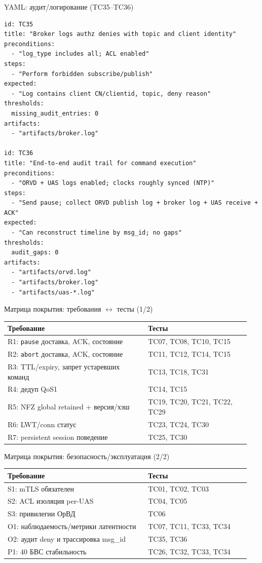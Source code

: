 \documentclass[aspectratio=169]{beamer}
\begin{document}
\begin{frame}{YAML: аудит/логирование (TC35--TC36)}
\small
\begin{verbatim}
id: TC35
title: "Broker logs authz denies with topic and client identity"
preconditions:
  - "log_type includes all; ACL enabled"
steps:
  - "Perform forbidden subscribe/publish"
expected:
  - "Log contains client CN/clientid, topic, deny reason"
thresholds:
  missing_audit_entries: 0
artifacts:
  - "artifacts/broker.log"

id: TC36
title: "End-to-end audit trail for command execution"
preconditions:
  - "ORVD + UAS logs enabled; clocks roughly synced (NTP)"
steps:
  - "Send pause; collect ORVD publish log + broker log + UAS receive + ACK"
expected:
  - "Can reconstruct timeline by msg_id; no gaps"
thresholds:
  audit_gaps: 0
artifacts:
  - "artifacts/orvd.log"
  - "artifacts/broker.log"
  - "artifacts/uas-*.log"
\end{verbatim}
\end{frame}

\begin{frame}{Матрица покрытия: требования $\leftrightarrow$ тесты (1/2)}
\small
\begin{tabular}{@{}p{0.55\linewidth}p{0.40\linewidth}@{}}
\toprule
Требование & Тесты \\
\midrule
R1: \texttt{pause} доставка, ACK, состояние & TC07, TC08, TC10, TC15 \\
R2: \texttt{abort} доставка, ACK, состояние & TC11, TC12, TC14, TC15 \\
R3: TTL/expiry, запрет устаревших команд & TC13, TC18, TC31 \\
R4: дедуп QoS1 & TC14, TC15 \\
R5: NFZ global retained + версия/хэш & TC19, TC20, TC21, TC22, TC29 \\
R6: LWT/conn статус & TC23, TC24, TC30 \\
R7: persistent session поведение & TC25, TC30 \\
\bottomrule
\end{tabular}
\end{frame}

\begin{frame}{Матрица покрытия: безопасность/эксплуатация (2/2)}
\small
\begin{tabular}{@{}p{0.55\linewidth}p{0.40\linewidth}@{}}
\toprule
Требование & Тесты \\
\midrule
S1: mTLS обязателен & TC01, TC02, TC03 \\
S2: ACL изоляция per-UAS & TC04, TC05 \\
S3: привилегии ОрВД & TC06 \\
O1: наблюдаемость/метрики латентности & TC07, TC11, TC33, TC34 \\
O2: аудит deny и трассировка msg\_id & TC35, TC36 \\
P1: 40 БВС стабильность & TC26, TC32, TC33, TC34 \\
\bottomrule
\end{tabular}
\end{frame}
\end{document}
